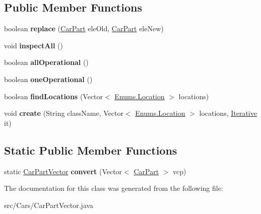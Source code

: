 \subsection*{Public Member Functions}
\begin{DoxyCompactItemize}
\item 
\hypertarget{classCars_1_1CarPartVector_a1c6a5a8d049ecb65a8d0112f9270f429}{}boolean {\bfseries replace} (\hyperlink{classCars_1_1CarPart}{Car\+Part} ele\+Old, \hyperlink{classCars_1_1CarPart}{Car\+Part} ele\+New)\label{classCars_1_1CarPartVector_a1c6a5a8d049ecb65a8d0112f9270f429}

\item 
\hypertarget{classCars_1_1CarPartVector_ad4aecfdfc302dd502a626b594d0a1697}{}void {\bfseries inspect\+All} ()\label{classCars_1_1CarPartVector_ad4aecfdfc302dd502a626b594d0a1697}

\item 
\hypertarget{classCars_1_1CarPartVector_a8a65c1c7f791193517f72d4da8cf5f9d}{}boolean {\bfseries all\+Operational} ()\label{classCars_1_1CarPartVector_a8a65c1c7f791193517f72d4da8cf5f9d}

\item 
\hypertarget{classCars_1_1CarPartVector_a1cb6cfda741e40c2ad33258ffb6faa38}{}boolean {\bfseries one\+Operational} ()\label{classCars_1_1CarPartVector_a1cb6cfda741e40c2ad33258ffb6faa38}

\item 
\hypertarget{classCars_1_1CarPartVector_a1aca5e2021f13ef5a15610f16f1a857e}{}boolean {\bfseries find\+Locations} (Vector$<$ \hyperlink{enumEnums_1_1Location}{Enums.\+Location} $>$ locations)\label{classCars_1_1CarPartVector_a1aca5e2021f13ef5a15610f16f1a857e}

\item 
\hypertarget{classCars_1_1CarPartVector_a202b162ca9cf3a19128c9e210c8f00bb}{}void {\bfseries create} (String class\+Name, Vector$<$ \hyperlink{enumEnums_1_1Location}{Enums.\+Location} $>$ locations, \hyperlink{interfaceInterfaces_1_1Iterative}{Iterative} it)\label{classCars_1_1CarPartVector_a202b162ca9cf3a19128c9e210c8f00bb}

\end{DoxyCompactItemize}
\subsection*{Static Public Member Functions}
\begin{DoxyCompactItemize}
\item 
\hypertarget{classCars_1_1CarPartVector_ab8a03fc8aa2b833c3adcf0b046333bed}{}static \hyperlink{classCars_1_1CarPartVector}{Car\+Part\+Vector} {\bfseries convert} (Vector$<$ \hyperlink{classCars_1_1CarPart}{Car\+Part} $>$ vcp)\label{classCars_1_1CarPartVector_ab8a03fc8aa2b833c3adcf0b046333bed}

\end{DoxyCompactItemize}


The documentation for this class was generated from the following file\+:\begin{DoxyCompactItemize}
\item 
src/\+Cars/Car\+Part\+Vector.\+java\end{DoxyCompactItemize}
